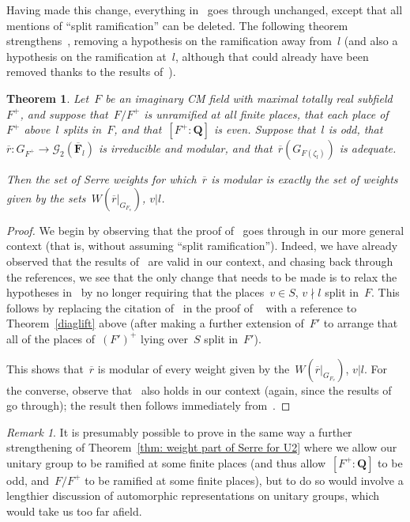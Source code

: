 \documentclass{amsart}
\renewcommand{\mathbb}{\mathbf}
\renewcommand{\ell}{l}
\newtheorem{thm}[subsubsection]{Theorem}
\theoremstyle{definition}
\theoremstyle{remark}
\newtheorem{rem}[subsubsection]{Remark}
\newcommand{\mar}[1]{}
\newcommand{\mar}[1]{\marginpar{\raggedright\tiny squirrel #1}}
\newcommand{\F}{\FF}
\newcommand{\Q}{\QQ}
\newcommand{\FF}{{\mathbb F}}
\newcommand{\QQ}{{\mathbb Q}}
\newcommand{\cG}{{\mathcal G}}
\newcommand{\Fbar}{\overline{\F}}
\newcommand{\Flbar}{\Fbar_{\ell}}
\newcommand{\rbar}{\overline{r}}
\begin{document}
Having made this change, everything in~\cite[\S 2]{MR3072811} goes
through unchanged, except that all mentions of ``split ramification''
can be deleted. The following theorem strengthens~\cite[Thm.\ A]{MR3164985}, removing
a hypothesis on the ramification away from~$l$ (and also a hypothesis
on the ramification at~$l$, although that could already have been
removed thanks to the results of~\cite{MR3324938}).
 \begin{thm}%
  \label{thm: weight part of Serre for U2}
  Let~$F$ be an imaginary CM field with maximal totally real
  subfield~$F^+$, and suppose that~$F/F^+$ is unramified at all finite
  places, that each place of~$F^+$ above~$l$ splits in~$F$, and
  that~$[F^+:\Q]$ is even. Suppose that~$l$ is odd, that
  $\rbar:G_{F^+}\to\cG_2(\Flbar)$ is irreducible and modular, and
  that~$\rbar(G_{F(\zeta_l)})$ is adequate.

Then the set of Serre weights for which~$\rbar$ is modular is exactly
the set of weights given by the sets~$W(\rbar|_{G_{F_v}})$, $v|l$.%
\end{thm}
\begin{proof}We begin by observing that the proof of~\cite[Thm.\
  5.1.3]{MR3072811} goes through in our more general context (that is,
  without assuming ``split ramification''). Indeed,  we have
  already observed that the results of~\cite[\S 2]{MR3072811} are valid in
  our context, and chasing back
  through the references, we see that the only change that needs to be
  made is to relax the hypotheses in~\cite[Thm.\
  3.1.3]{MR3072811} by no longer requiring that the places~$v\in S$,
  $v\nmid l$ split in~$F$. This follows by replacing the citation of~\cite[Thm.\
  A.4.1]{MR3072811} in the proof of ~\cite[Thm.\
  3.1.3]{MR3072811} with a reference to Theorem~\ref{diaglift}
  above (after making a further extension of~$F'$ to arrange
  that all of the places of~$(F')^+$ lying over~$S$ split in~$F'$). 

This shows that~$\rbar$ is modular of every weight given by
the~$W(\rbar|_{G_{F_v}})$, $v|l$. For the converse, observe
that~\cite[Cor.\ 4.1.8]{MR3072811} also holds in our context (again,
since the results of~\cite[\S 2]{MR3072811} go through); the result
then follows immediately from~\cite[Thm.\ 6.1.8]{MR3324938}.
\end{proof}

\begin{rem}
  \label{rem: non quasi split groups}It is presumably possible to
  prove in the same way a further strengthening of Theorem~\ref{thm: weight part of
    Serre for U2} where we allow our unitary group to be ramified at
  some finite places (and thus allow~$[F^+:\Q]$ to be odd, and~$F/F^+$
  to be ramified at some finite places), but to do so would involve a
  lengthier discussion of automorphic representations on unitary
  groups, which would take us too far afield. %
\end{rem}
\end{document}

